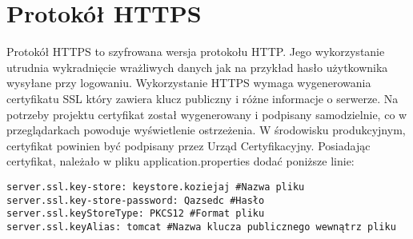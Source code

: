 \documentclass[a4paper,12pt,twoside,openany]{report}
\begin{document}
\section{Protokół HTTPS}
Protokół HTTPS to szyfrowana wersja protokołu HTTP. Jego wykorzystanie utrudnia wykradnięcie wrażliwych danych jak na przykład hasło użytkownika wysyłane przy logowaniu. Wykorzystanie HTTPS wymaga wygenerowania certyfikatu SSL \cite{Owasp} który zawiera klucz publiczny i różne informacje o serwerze. Na potrzeby projektu certyfikat został wygenerowany i podpisany samodzielnie, co w przeglądarkach powoduje wyświetlenie ostrzeżenia. W środowisku produkcyjnym, certyfikat powinien być podpisany przez Urząd Certyfikacyjny. Posiadając certyfikat, należało w pliku application.properties dodać poniższe linie:\\
\begin{lstlisting}
server.ssl.key-store: keystore.koziejaj #Nazwa pliku
server.ssl.key-store-password: Qazsedc #Hasło
server.ssl.keyStoreType: PKCS12 #Format pliku
server.ssl.keyAlias: tomcat #Nazwa klucza publicznego wewnątrz pliku
\end{lstlisting}
 
\end{document}

